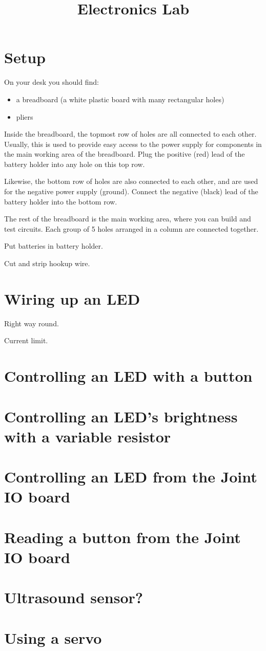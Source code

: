 \documentclass{article}
\title{Electronics Lab}
\begin{document}
\maketitle

\section{Setup}

On your desk you should find:

\begin{itemize}
\item a breadboard (a white plastic board with many rectangular holes)
\item pliers
\end{itemize}

Inside the breadboard, the topmost row of holes are all connected to each other.
Usually, this is used to provide easy access to the power supply for components
in the main working area of the breadboard. Plug the positive (red) lead of the
battery holder into any hole on this top row.

Likewise, the bottom row of holes are also connected to each other, and are used
for the negative power supply (ground). Connect the negative (black) lead of the
battery holder into the bottom row.

The rest of the breadboard is the main working area, where you can build and
test circuits. Each group of 5 holes arranged in a column are connected
together.

Put batteries in battery holder.

Cut and strip hookup wire.

\section{Wiring up an LED}

Right way round.

Current limit.

\section{Controlling an LED with a button}

\section{Controlling an LED's brightness with a variable resistor}

\section{Controlling an LED from the Joint IO board}

\section{Reading a button from the Joint IO board}

\section{Ultrasound sensor?}

\section{Using a servo}
\end{document}
